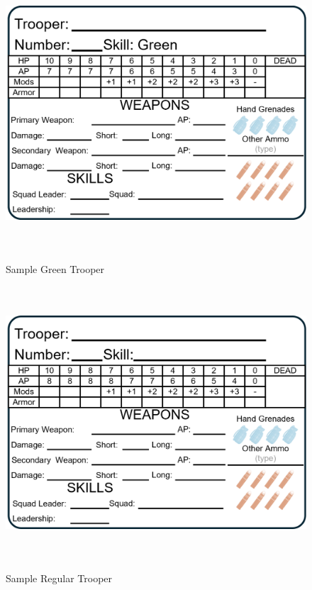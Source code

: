\begin{figure}[!h]
  \centering
  \includegraphics[alt='Sample Green Trooper', width=5.63in, height=4in]{img/GreenTrooper.png}
  \caption*{Sample Green Trooper}
\end{figure}

\begin{figure}[!h]
  \centering
  \includegraphics[alt='Sample Regular Trooper', width=5.63in, height=4in]{img/RegularTrooper.png}
  \caption*{Sample Regular Trooper}
\end{figure}


